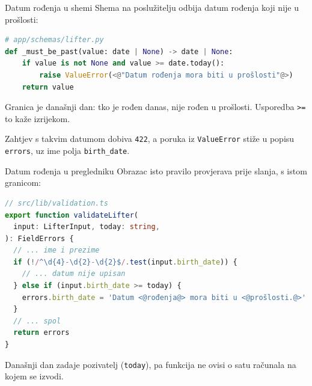 \begin{frame}[fragile]{Datum rođenja u shemi}
Shema na poslužitelju odbija datum rođenja koji nije u prošlosti:

\begin{lstlisting}[language=python]
# app/schemas/lifter.py
def _must_be_past(value: date | None) -> date | None:
    if value is not None and value >= date.today():
        raise ValueError(<@"Datum rođenja mora biti u prošlosti"@>)
    return value
\end{lstlisting}

\vspace{0.4em}
Granica je današnji dan: tko je rođen danas, nije rođen u prošlosti. Usporedba \texttt{>=} to kaže izrijekom.

\vspace{0.4em}
Zahtjev s takvim datumom dobiva \texttt{422}, a poruka iz \texttt{ValueError} stiže u popisu \texttt{errors}, uz ime polja \texttt{birth\_date}.
\end{frame}

\begin{frame}[fragile]{Datum rođenja u pregledniku}
Obrazac isto pravilo provjerava prije slanja, s istom granicom:

\begin{lstlisting}[language=typescript]
// src/lib/validation.ts
export function validateLifter(
  input: LifterInput, today: string,
): FieldErrors {
  // ... ime i prezime
  if (!/^\d{4}-\d{2}-\d{2}$/.test(input.birth_date)) {
    // ... datum nije upisan
  } else if (input.birth_date >= today) {
    errors.birth_date = 'Datum <@rođenja@> mora biti u <@prošlosti.@>'
  }
  // ... spol
  return errors
}
\end{lstlisting}

\vspace{0.2em}
Današnji dan zadaje pozivatelj (\texttt{today}), pa funkcija ne ovisi o satu računala na kojem se izvodi.
\end{frame}

